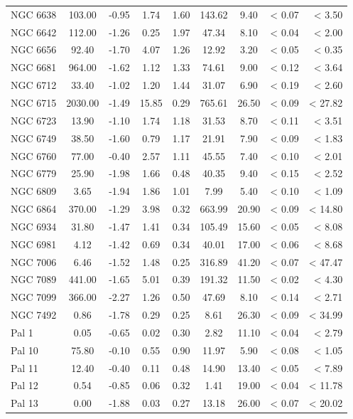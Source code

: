 \documentclass[doublespace,nopageskip]{VTthesis} %
\begin{document}
\begin{appendices}
\begin{table}
\begin{tabular}{lcccccccr}
NGC 6638 & 103.00 & -0.95 & 1.74 & 1.60 & 143.62 & 9.40 & < 0.07 & < 3.50\\
NGC 6642 & 112.00 & -1.26 & 0.25 & 1.97 & 47.34 & 8.10 & < 0.04 & < 2.00\\
NGC 6656 & 92.40 & -1.70 & 4.07 & 1.26 & 12.92 & 3.20 & < 0.05 & < 0.35\\
NGC 6681 & 964.00 & -1.62 & 1.12 & 1.33 & 74.61 & 9.00 & < 0.12 & < 3.64\\
NGC 6712 & 33.40 & -1.02 & 1.20 & 1.44 & 31.07 & 6.90 & < 0.19 & < 2.60\\
NGC 6715 & 2030.00 & -1.49 & 15.85 & 0.29 & 765.61 & 26.50 & < 0.09 & < 27.82\\
NGC 6723 & 13.90 & -1.10 & 1.74 & 1.18 & 31.53 & 8.70 & < 0.11 & < 3.51\\
NGC 6749 & 38.50 & -1.60 & 0.79 & 1.17 & 21.91 & 7.90 & < 0.09 & < 1.83\\
NGC 6760 & 77.00 & -0.40 & 2.57 & 1.11 & 45.55 & 7.40 & < 0.10 & < 2.01\\
NGC 6779 & 25.90 & -1.98 & 1.66 & 0.48 & 40.35 & 9.40 & < 0.15 & < 2.52\\
NGC 6809 & 3.65 & -1.94 & 1.86 & 1.01 & 7.99 & 5.40 & < 0.10 & < 1.09\\
NGC 6864 & 370.00 & -1.29 & 3.98 & 0.32 & 663.99 & 20.90 & < 0.09 & < 14.80\\
NGC 6934 & 31.80 & -1.47 & 1.41 & 0.34 & 105.49 & 15.60 & < 0.05 & < 8.08\\
NGC 6981 & 4.12 & -1.42 & 0.69 & 0.34 & 40.01 & 17.00 & < 0.06 & < 8.68\\
NGC 7006 & 6.46 & -1.52 & 1.48 & 0.25 & 316.89 & 41.20 & < 0.07 & < 47.47\\
NGC 7089 & 441.00 & -1.65 & 5.01 & 0.39 & 191.32 & 11.50 & < 0.02 & < 4.30\\
NGC 7099 & 366.00 & -2.27 & 1.26 & 0.50 & 47.69 & 8.10 & < 0.14 & < 2.71\\
NGC 7492 & 0.86 & -1.78 & 0.29 & 0.25 & 8.61 & 26.30 & < 0.09 & < 34.99\\
Pal 1 & 0.05 & -0.65 & 0.02 & 0.30 & 2.82 & 11.10 & < 0.04 & < 2.79\\
Pal 10 & 75.80 & -0.10 & 0.55 & 0.90 & 11.97 & 5.90 & < 0.08 & < 1.05\\
Pal 11 & 12.40 & -0.40 & 0.11 & 0.48 & 14.90 & 13.40 & < 0.05 & < 7.89\\
Pal 12 & 0.54 & -0.85 & 0.06 & 0.32 & 1.41 & 19.00 & < 0.04 & < 11.78\\
Pal 13 & 0.00 & -1.88 & 0.03 & 0.27 & 13.18 & 26.00 & < 0.07 & < 20.02\\

\end{tabular}
\end{table}
\end{appendices}
\end{document}
